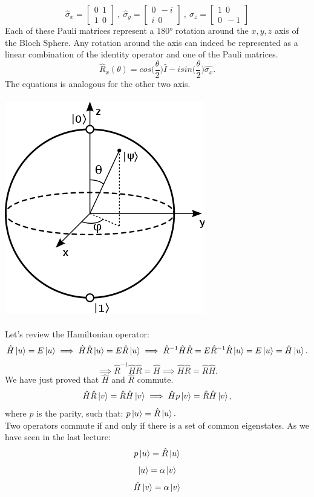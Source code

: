 \documentclass{article}
\begin{document}
$$\hat{\sigma}_x = \begin{bmatrix}
    0 \ \  1 \\ 1 \ \ 0
\end{bmatrix} \ , \ \hat{\sigma}_y =\begin{bmatrix}
    0 \ \ -i \\ i \  \ 0
\end{bmatrix} \ , \ \hat{\sigma}_z = \begin{bmatrix}
    1 \ \  0 \\ 0 \ \ -1
\end{bmatrix} $$
Each of these Pauli matrices represent a $180$° rotation around the $x,y,z$ axis of the Bloch Sphere. Any rotation around the axis can indeed be represented as a linear combination of the identity operator and one of the Pauli matrices.
$$\hat{R}_x(\theta)= cos\biggl(\frac{\theta}{2} \biggl) \hat{I} - i sin \biggl(\frac{\theta}{2} \biggl) \hat{\sigma_x}.$$
The equations is analogous for the other two axis. \\ \\ 
\includegraphics[scale=0.6]{Bloch_sphere.svg.png} \\ \\ 
Let's review the Hamiltonian operator: 
$$\hat{H}\ket{u} = E\ket{u} \implies \hat{H}\hat{R} \ket{u} = E\hat{R}\ket{u} \implies \hat{R}^{-1} \hat{H}\hat{R} = E \hat{R}^{-1}\hat{R}\ket{u} = E\ket{u} = \hat{H} \ket{u}.$$
$$\implies \hat{R}^{-1}\hat{H}\hat{R}=\hat{H} \implies \hat{H}\hat{R} = \hat{R}\hat{H}. $$
We have just proved that $\hat{H}$ and $\hat{R}$ commute.
$$\hat{H}\hat{R}\ket{v}=\hat{R}\hat{H}\ket{v} \implies \hat{H}p\ket{v} = \hat{R}\hat{H}\ket{v},$$
where $p$ is the parity, such that: $p\ket{u} = \hat{R}\ket{u}.$ \\ 
Two operators commute if and only if there is a set of common eigenstates.
As we have seen in the last lecture:
$$p\ket{u}=\hat{R}\ket{u}$$
$$\ket{u} = \alpha \ket{v}$$
$$\hat{H}\ket{v} = \alpha \ket{v}$$
\end{document}
